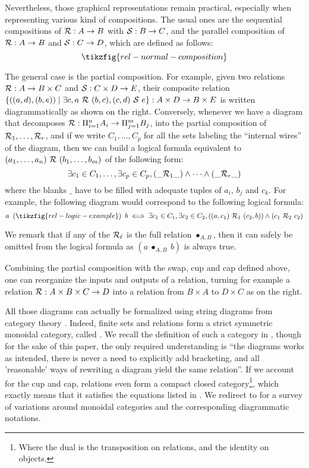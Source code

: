 Nevertheless, those graphical representations remain practical, especially when representing various kind of compositions. 
The usual ones are the sequential compositions of $\R : A \to B$ with $\S : B \to C$, and the parallel composition of $\R : A \to B$ and $\S : C \to D$, which are defined as follows:
\[ \tikzfig{rel-normal-composition}\]

\begin{wrapfigure}{r}{0.2\textwidth}
\end{wrapfigure}
The general case is the partial composition. For example, given two relations $\R : A \to B \times C$ and $\S : C \times D \to E$, their composite relation $\{ ((a,d),(b,e)) \mid \exists c, a~\R~(b,c), (c,d)~\S~e \} : A \times D \to B \times E$ is written diagrammatically as shown on the right. Conversely, whenever we have a diagram that decomposes $\R : \Pi_{i=1}^n A_i \to \Pi_{j=1}^m B_j$, into the partial composition of $\R_1,\dots,\R_r$, and if we write $C_1, \dots, C_p$ for all the sets labeling the ``internal wires'' of the diagram, then we can build a logical formula equivalent to $(a_1,\dots,a_n)~\R~(b_1,\dots,b_m)$ of the following form:
\[ \exists c_1 \in C_1, \dots, \exists c_p \in C_p, (\_ \R_1 \_) \land \dots \land (\_ \R_r \_) \]
where the blanks $\_$ have to be filled with adequate tuples of $a_i$, $b_j$ and $c_k$. For example, the following diagram would correspond to the following logical formula:
\[a~\left(\tikzfig{rel-logic-example}\right)~b \iff \exists c_1 \in C_1, \exists c_2 \in C_2, ((a,c_1)~\R_1~(c_2,b)) \land (c_1~\R_2~c_2) \]
\begin{wrapfigure}{r}{0.2\textwidth}
\end{wrapfigure}

We remark that if any of the $\R_\ell$ is the full relation $\bullet_{A,B}$, then it can safely be omitted from the logical formula as $(a~\bullet_{A,B}~b)$ is always true.

Combining the partial composition with the swap, cup and cap defined above, one can reorganize the inputs and outputs of a relation, turning for example a relation $\R : A \times B \times C \to D$ into a relation from $B \times A$ to $D \times C$ as on the right. 

All those diagrams can actually be formalized using string diagrams from category theory  \cite{MacLane}. Indeed, finite sets and relations form a strict symmetric monoidal category, called . We recall the definition of such a category in , though for the sake of this paper, the only required understanding is ``the diagrams works as intended, there is never a need to explicitly add bracketing, and all 'reasonable' ways of rewriting a diagram yield the same relation''. If we account for the cup and cap, relations even form a compact closed category\footnote{Where the dual is the transposition on relations, and the identity on objects.}, which exactly means that it satisfies the equations listed in . We redirect to \cite{selinger2011survey} for a survey of variations around monoidal categories and the corresponding diagrammatic notations.
